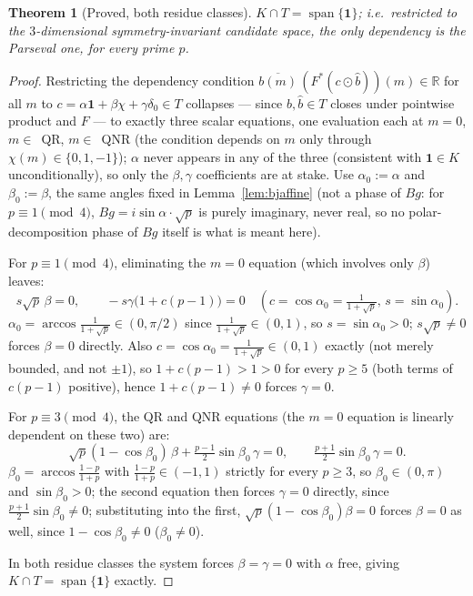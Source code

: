 \documentclass[11pt]{article}
\theoremstyle{plain}
\newtheorem{theorem}{Theorem}[section]
\theoremstyle{definition}
\theoremstyle{remark}
\newcommand{\R}{\mathbb R}
\begin{document}
\begin{theorem}[Proved, both residue classes]\label{thm:E0}
$K\cap T=\operatorname{span}\{\mathbf1\}$; i.e.\ restricted to the
$3$-dimensional symmetry-invariant candidate space, the only dependency is
the Parseval one, for every prime $p$.
\end{theorem}
\begin{proof}
Restricting the dependency condition
$\overline{b(m)}\,(F^*(c\odot\hat b))(m)\in\R$ for all $m$ to
$c=\alpha\mathbf1+\beta\chi+\gamma\delta_0\in T$ collapses --- since
$b,\hat b\in T$ closes under pointwise product and $F$ --- to exactly
three scalar equations, one evaluation each at $m=0$, $m\in$~QR,
$m\in$~QNR (the condition depends on $m$ only through $\chi(m)\in\{0,1,-1\}$);
$\alpha$ never appears in any of the three (consistent with
$\mathbf1\in K$ unconditionally), so only the $\beta,\gamma$ coefficients
are at stake. Use $\alpha_0:=\alpha$ and $\beta_0:=\beta$, the same angles
fixed in Lemma~\ref{lem:bjaffine} (not a phase of $Bg$: for
$p\equiv1\pmod4$, $Bg=i\sin\alpha\cdot\sqrt p$ is purely imaginary, never
real, so no polar-decomposition phase of $Bg$ itself is what is meant
here).

For $p\equiv1\pmod4$, eliminating the $m=0$ equation (which involves only
$\beta$) leaves:
$$s\sqrt p\,\beta=0,\qquad -s\gamma\bigl(1+c(p-1)\bigr)=0\quad(c=\cos\alpha_0=\tfrac1{1+\sqrt p},\,s=\sin\alpha_0).$$
$\alpha_0=\arccos\frac1{1+\sqrt p}\in(0,\pi/2)$ since
$\frac1{1+\sqrt p}\in(0,1)$, so $s=\sin\alpha_0>0$; $s\sqrt p\ne0$ forces
$\beta=0$ directly. Also $c=\cos\alpha_0=\frac1{1+\sqrt p}\in(0,1)$
exactly (not merely bounded, and not $\pm1$), so $1+c(p-1)>1>0$ for every
$p\ge5$ (both terms of $c(p-1)$ positive), hence $1+c(p-1)\ne0$ forces
$\gamma=0$.

For $p\equiv3\pmod4$, the QR and QNR equations (the $m=0$ equation is
linearly dependent on these two) are:
$$\sqrt p(1-\cos\beta_0)\,\beta+\tfrac{p-1}2\sin\beta_0\,\gamma=0,\qquad
\tfrac{p+1}2\sin\beta_0\,\gamma=0.$$
$\beta_0=\arccos\frac{1-p}{1+p}$ with $\frac{1-p}{1+p}\in(-1,1)$ strictly
for every $p\ge3$, so $\beta_0\in(0,\pi)$ and $\sin\beta_0>0$; the second
equation then forces $\gamma=0$ directly, since $\tfrac{p+1}2\sin\beta_0\ne0$;
substituting into the first, $\sqrt p(1-\cos\beta_0)\beta=0$ forces
$\beta=0$ as well, since $1-\cos\beta_0\ne0$ ($\beta_0\ne0$).

In both residue classes the system forces $\beta=\gamma=0$ with $\alpha$
free, giving $K\cap T=\operatorname{span}\{\mathbf1\}$ exactly.
\end{proof}
\end{document}

